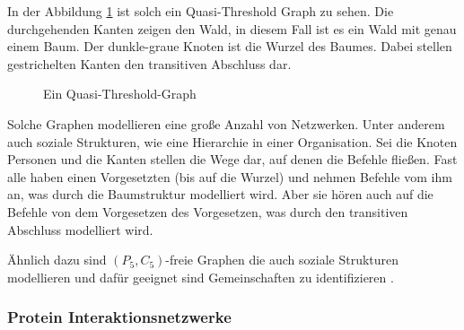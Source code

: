 \documentclass[12pt,a4paper,onecolumn,oneside,titlepage]{article}
\begin{document}
In der Abbildung \ref{fig:quasi-threhold} ist solch ein Quasi-Threshold Graph zu sehen. Die durchgehenden Kanten zeigen den Wald, in diesem Fall ist es ein Wald mit genau einem Baum. Der dunkle-graue Knoten ist die Wurzel des Baumes.  Dabei stellen gestrichelten Kanten den transitiven Abschluss dar. 
\begin{figure}
  \begin{center}
    


  \end{center}
  \caption{Ein Quasi-Threshold-Graph}
  \label{fig:quasi-threhold}
\end{figure}

Solche Graphen modellieren eine große Anzahl von Netzwerken. Unter anderem auch soziale Strukturen, wie eine Hierarchie in einer Organisation. Sei die Knoten Personen und die Kanten stellen die Wege dar, auf denen die Befehle fließen. Fast alle haben einen Vorgesetzten (bis auf die Wurzel) und nehmen Befehle vom ihm an, was durch die Baumstruktur modelliert wird. Aber sie hören auch auf die Befehle von dem Vorgesetzen des Vorgesetzen, was durch den transitiven Abschluss modelliert wird\cite{NastosG13}. 

Ähnlich dazu sind $(P_5,C_5)$-freie Graphen die auch soziale Strukturen modellieren und dafür geeignet sind Gemeinschaften zu identifizieren \cite{Schoch15}. 

\subsubsection{Protein Interaktionsnetzwerke}
\end{document}
